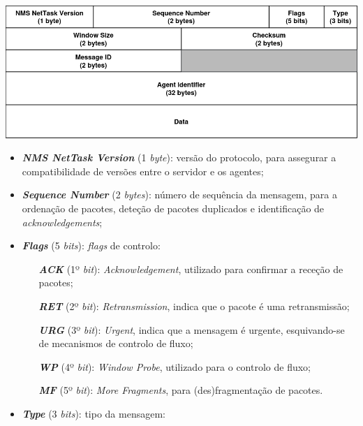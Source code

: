 \documentclass[a4paper,12pt]{scrreprt}
\begin{document}
\begin{minipage}{\textwidth}
    \centering
    \includegraphics[width=\textwidth]{img/nettask_header.png}
    \label{fig:nettask_message_format}
\end{minipage}

\begin{itemize}
    \item \textbf{\textit{NMS NetTask Version}} (1 \textit{byte}):  versão do protocolo,
        para assegurar a compatibilidade de versões entre o servidor e os agentes;
    \item \textbf{\textit{Sequence Number}}     (2 \textit{bytes}): número de sequência da mensagem,
        para a ordenação de pacotes, deteção de pacotes duplicados e identificação de \textit{acknowledgements};
    \item \textbf{\textit{Flags}}               (5 \textit{bits}):  \textit{flags} de controlo:
        \begin{itemize}
           \item [\textbf{\textit{ACK}}] (1º \textit{bit}): \textit{Acknowledgement}, utilizado para confirmar a receção de pacotes;
           \item [\textbf{\textit{RET}}] (2º \textit{bit}): \textit{Retransmission}, indica que o pacote é uma retransmissão;
           \item [\textbf{\textit{URG}}] (3º \textit{bit}): \textit{Urgent}, indica que a mensagem é urgente, esquivando-se de mecanismos de controlo de fluxo;
           \item [\textbf{\textit{WP}} ] (4º \textit{bit}): \textit{Window Probe}, utilizado para o controlo de fluxo;
           \item [\textbf{\textit{MF}} ] (5º \textit{bit}): \textit{More Fragments}, para (des)fragmentação de pacotes.
        \end{itemize}
    \item \textbf{\textit{Type}}                (3 \textit{bits}): tipo da mensagem:

\end{itemize}
\end{document}
